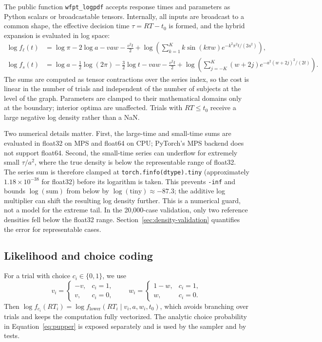 \documentclass[11pt]{article}
\begin{document}
The public function \texttt{wfpt\_logpdf} accepts response times and parameters as Python scalars or broadcastable tensors. Internally, all inputs are broadcast to a common shape, the effective decision time $\tau=RT-t_0$ is formed, and the hybrid expansion is evaluated in log space:
\begin{align}
  \log f_\ell(t)
  &=
  \log\pi - 2\log a - vaw - \frac{v^2t}{2}
  + \log\!\left(\sum_{k=1}^{K} k\sin(k\pi w)e^{-k^2\pi^2t/(2a^2)}\right),
  \label{eq:loglarge}\\
  \log f_s(t)
  &=
  \log a - \frac{1}{2}\log(2\pi) - \frac{3}{2}\log t - vaw - \frac{v^2t}{2}
  + \log\!\left(\sum_{j=-K}^{K}(w+2j)e^{-a^2(w+2j)^2/(2t)}\right).
  \label{eq:logsmall}
\end{align}
The sums are computed as tensor contractions over the series index, so the cost is linear in the number of trials and independent of the number of subjects at the level of the graph. Parameters are clamped to their mathematical domains only at the boundary; interior optima are unaffected. Trials with $RT\le t_0$ receive a large negative log density rather than a NaN.

Two numerical details matter. First, the large-time and small-time sums are evaluated in float32 on MPS and float64 on CPU; PyTorch's MPS backend does not support float64. Second, the small-time series can underflow for extremely small $\tau/a^2$, where the true density is below the representable range of float32. The series sum is therefore clamped at \texttt{torch.finfo(dtype).tiny} (approximately $1.18\times10^{-38}$ for float32) before its logarithm is taken. This prevents \texttt{-inf} and bounds $\log(\text{sum})$ from below by $\log(\text{tiny})\approx-87.3$; the additive log multiplier can shift the resulting log density further. This is a numerical guard, not a model for the extreme tail. In the 20,000-case validation, only two reference densities fell below the float32 range. Section~\ref{sec:density-validation} quantifies the error for representable cases.

\subsection{Likelihood and choice coding}

For a trial with choice $c_i\in\{0,1\}$, we use
\begin{equation}
  v_i =
  \begin{cases}
    -v, & c_i=1,\\
    v, & c_i=0,
  \end{cases}
  \qquad
  w_i =
  \begin{cases}
    1-w, & c_i=1,\\
    w, & c_i=0.
  \end{cases}
  \label{eq:choice-transform}
\end{equation}
Then $\log f_{c_i}(RT_i)=\log f_{\mathrm{lower}}(RT_i\mid v_i,a,w_i,t_0)$, which avoids branching over trials and keeps the computation fully vectorized. The analytic choice probability in Equation~\eqref{eq:pupper} is exposed separately and is used by the sampler and by tests.
\end{document}
